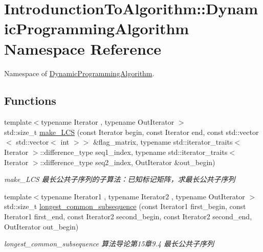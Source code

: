 \hypertarget{namespace_introdunction_to_algorithm_1_1_dynamic_programming_algorithm}{}\section{Introdunction\+To\+Algorithm\+:\+:Dynamic\+Programming\+Algorithm Namespace Reference}
\label{namespace_introdunction_to_algorithm_1_1_dynamic_programming_algorithm}


Namespace of \hyperlink{namespace_introdunction_to_algorithm_1_1_dynamic_programming_algorithm}{Dynamic\+Programming\+Algorithm}.  


\subsection*{Functions}
\begin{DoxyCompactItemize}
\item 
{\footnotesize template$<$typename Iterator , typename Out\+Iterator $>$ }\\std\+::size\+\_\+t \hyperlink{namespace_introdunction_to_algorithm_1_1_dynamic_programming_algorithm_a01cfb7cc6a668a29024f83a65481196b}{make\+\_\+\+L\+C\+S} (const Iterator begin, const Iterator end, const std\+::vector$<$ std\+::vector$<$ int $>$$>$ \&flag\+\_\+matrix, typename std\+::iterator\+\_\+traits$<$ Iterator $>$\+::difference\+\_\+type seq1\+\_\+index, typename std\+::iterator\+\_\+traits$<$ Iterator $>$\+::difference\+\_\+type seq2\+\_\+index, Out\+Iterator \&out\+\_\+begin)
\begin{DoxyCompactList}\small\item\em make\+\_\+\+L\+C\+S 最长公共子序列的子算法：已知标记矩阵，求最长公共子序列 \end{DoxyCompactList}\item 
{\footnotesize template$<$typename Iterator1 , typename Iterator2 , typename Out\+Iterator $>$ }\\std\+::size\+\_\+t \hyperlink{namespace_introdunction_to_algorithm_1_1_dynamic_programming_algorithm_a000f514133c72dd4c28127bc83e7bf02}{longest\+\_\+common\+\_\+subsequence} (const Iterator1 first\+\_\+begin, const Iterator1 first\+\_\+end, const Iterator2 second\+\_\+begin, const Iterator2 second\+\_\+end, Out\+Iterator out\+\_\+begin)
\begin{DoxyCompactList}\small\item\em longest\+\_\+common\+\_\+subsequence 算法导论第15章9.4 最长公共子序列 \end{DoxyCompactList}\end{DoxyCompactItemize}


